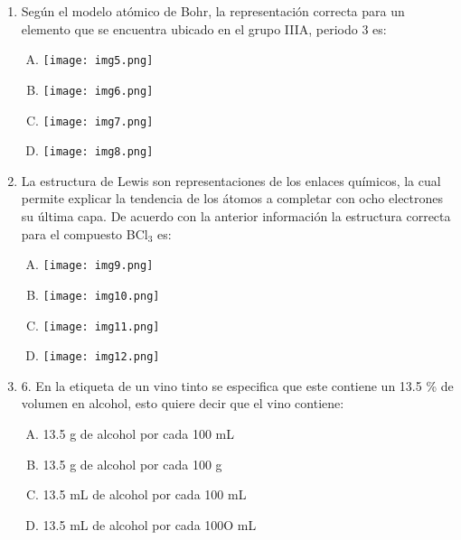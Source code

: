 \begin{enumerate}


\item  Según el modelo atómico de Bohr, la representación correcta para un elemento que se encuentra ubicado en el grupo IIIA, periodo 3 es:\label{jenn-4}


\begin{enumerate}[(A)]
\item \texttt{[image: img5.png]}
\item \texttt{[image: img6.png]}
\item \texttt{[image: img7.png]}\\
\item \texttt{[image: img8.png]}
\end{enumerate}




\item   La estructura de Lewis son representaciones de los enlaces químicos, la cual permite explicar la tendencia de los átomos a completar con ocho electrones su última capa. De acuerdo con la anterior información la estructura correcta para el compuesto BCl$_3$ es:\label{jenn-5}


\begin{enumerate}[(A)]
\item \texttt{[image: img9.png]}
\item \texttt{[image: img10.png]}
\item \texttt{[image: img11.png]}\\
\item \texttt{[image: img12.png]}
\end{enumerate}




\item  6. En la etiqueta de un vino tinto se especifica que este contiene un 13.5 \% de volumen en alcohol, esto quiere decir que el vino contiene:\label{jenn-6}


\begin{enumerate}[(A)]
\item 13.5 g de alcohol por cada 100 mL 
\item  13.5 g de alcohol por cada 100 g
\item  13.5 mL de alcohol por cada 100 mL
\item  13.5 mL de alcohol por cada 100O mL
\end{enumerate}



\end{enumerate}
